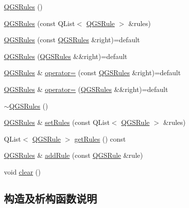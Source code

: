 \begin{DoxyCompactItemize}
\item 
\mbox{\hyperlink{class_q_g_s_rules_adcc3eeeb23280fc23dc6e57534fb64d2}{Q\+G\+S\+Rules}} ()
\item 
\mbox{\hyperlink{class_q_g_s_rules_a7dc24309faf9c036eeac881c9cae2797}{Q\+G\+S\+Rules}} (const Q\+List$<$ \mbox{\hyperlink{class_q_g_s_rules_1_1_q_g_s_rule}{Q\+G\+S\+Rule}} $>$ \&rules)
\item 
\mbox{\hyperlink{class_q_g_s_rules_a38f7715c203a3b23d6b38f07b811971a}{Q\+G\+S\+Rules}} (const \mbox{\hyperlink{class_q_g_s_rules}{Q\+G\+S\+Rules}} \&right)=default
\item 
\mbox{\hyperlink{class_q_g_s_rules_a1378a8bb4a84881b425c902e87794393}{Q\+G\+S\+Rules}} (\mbox{\hyperlink{class_q_g_s_rules}{Q\+G\+S\+Rules}} \&\&right)=default
\item 
\mbox{\hyperlink{class_q_g_s_rules}{Q\+G\+S\+Rules}} \& \mbox{\hyperlink{class_q_g_s_rules_a80782090d839a8daadbe89197c03fe97}{operator=}} (const \mbox{\hyperlink{class_q_g_s_rules}{Q\+G\+S\+Rules}} \&right)=default
\item 
\mbox{\hyperlink{class_q_g_s_rules}{Q\+G\+S\+Rules}} \& \mbox{\hyperlink{class_q_g_s_rules_a307c754e16fd1ff0ac90f7563336ca9f}{operator=}} (\mbox{\hyperlink{class_q_g_s_rules}{Q\+G\+S\+Rules}} \&\&right)=default
\item 
\mbox{\hyperlink{class_q_g_s_rules_a5bcddb7c3b3dad85ad20271fdb0b32ae}{$\sim$\+Q\+G\+S\+Rules}} ()
\item 
\mbox{\hyperlink{class_q_g_s_rules}{Q\+G\+S\+Rules}} \& \mbox{\hyperlink{class_q_g_s_rules_a7a241484b22485eef922021e2a51dc8b}{set\+Rules}} (const Q\+List$<$ \mbox{\hyperlink{class_q_g_s_rules_1_1_q_g_s_rule}{Q\+G\+S\+Rule}} $>$ \&rules)
\item 
Q\+List$<$ \mbox{\hyperlink{class_q_g_s_rules_1_1_q_g_s_rule}{Q\+G\+S\+Rule}} $>$ \mbox{\hyperlink{class_q_g_s_rules_af8fa146c7b19a4c1befc11bed6aea32d}{get\+Rules}} () const
\item 
\mbox{\hyperlink{class_q_g_s_rules}{Q\+G\+S\+Rules}} \& \mbox{\hyperlink{class_q_g_s_rules_addcca8c9adcede9124e996ac8439df2a}{add\+Rule}} (const \mbox{\hyperlink{class_q_g_s_rules_1_1_q_g_s_rule}{Q\+G\+S\+Rule}} \&rule)
\item 
void \mbox{\hyperlink{class_q_g_s_rules_af79a3e60c103027aa757da50189aba99}{clear}} ()
\end{DoxyCompactItemize}


\subsection{构造及析构函数说明}
\mbox{\label{class_q_g_s_rules_adcc3eeeb23280fc23dc6e57534fb64d2}} 
